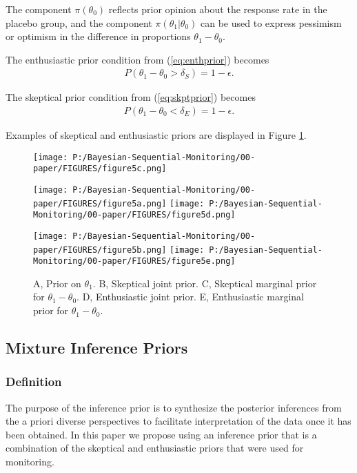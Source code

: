 \documentclass[12pt]{article}
\begin{document}
The component $\pi(\theta_0)$ reflects prior opinion about the response rate in the placebo group, and the component $\pi(\theta_1|\theta_0)$ can be used to express pessimism or optimism in the difference in proportions $\theta_1 - \theta_0$. 

The enthusiastic prior condition from (\ref{eq:enthprior}) becomes
\begin{align}
P(\theta_1-\theta_0>\delta_S)=1-\epsilon.
\end{align}

The skeptical prior condition from (\ref{eq:skptprior}) becomes
\begin{align}
P(\theta_1-\theta_0<\delta_E)=1-\epsilon.
\end{align}


Examples of skeptical and enthusiastic priors are displayed in Figure \ref{fig:figure5}.

\begin{figure}
\texttt{[image: P:/Bayesian-Sequential-Monitoring/00-paper/FIGURES/figure5c.png]}

\texttt{[image: P:/Bayesian-Sequential-Monitoring/00-paper/FIGURES/figure5a.png]}
\texttt{[image: P:/Bayesian-Sequential-Monitoring/00-paper/FIGURES/figure5d.png]}

\texttt{[image: P:/Bayesian-Sequential-Monitoring/00-paper/FIGURES/figure5b.png]}
\texttt{[image: P:/Bayesian-Sequential-Monitoring/00-paper/FIGURES/figure5e.png]}
\caption{A, Prior on $\theta_1$. B, Skeptical joint prior. C, Skeptical marginal prior for $\theta_1-\theta_0$. D, Enthusiastic joint prior. E, Enthusiastic marginal prior for $\theta_1-\theta_0$.}
\label{fig:figure5}
 \end{figure}
\subsection{Mixture Inference Priors}
\subsubsection{Definition}
The purpose of the inference prior is to synthesize the posterior inferences from the a priori diverse perspectives to facilitate interpretation of the data once it has been obtained. In this paper we propose using an inference prior that is a combination of the skeptical and enthusiastic priors that were used for monitoring.
\end{document}

